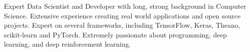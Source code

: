\small{Expert Data Scientist and Developer with long, strong background in Computer Science. Extensive experience creating real
world applications and open source projects. Expert on several frameworks, including TensorFlow, Keras, Theano, scikit-learn and PyTorch. Extremely
passionate about programming, deep learning, and deep reinforcement learning.}

